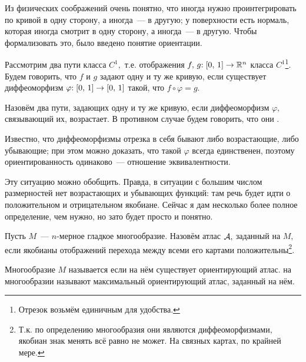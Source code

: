 \documentclass{notes}
\begin{document}
	Из физических соображений очень понятно, что иногда нужно проинтегрировать по кривой в одну сторону, а иногда~--- в другую; у поверхности есть нормаль, которая иногда смотрит в одну сторону, а иногда~--- в другую. Чтобы формализовать это, было введено понятие ориентации.

	\begin{de}
		Рассмотрим два пути класса $C^1,$ т.е. отображения $f, \, g \text{\text{:}} \; [0, \, 1] \to \mathbb{R}^n$ класса $C^1$\footnote{Отрезок возьмём единичным для удобства.}. Будем говорить, что $f$ и $g$ задают одну и ту же кривую, если существует диффеоморфизм $\varphi\text{\text{:}} \; [0, \, 1] \to [0, \, 1]$ такой, что $f \circ \varphi = g$. 
	\end{de}

	\begin{de}
		Назовём два пути, задающих одну и ту же кривую,  если диффеоморфизм $\varphi,$ связывающий их, возрастает. В противном случае будем говорить, что они .
	\end{de}

	\begin{rem}
		Известно, что диффеоморфизмы отрезка в себя бывают либо возрастающие, либо убывающие; при этом можно доказать, что такой $\varphi$ всегда единственен, поэтому ориентированность одинаково~--- отношение эквивалентности.
	\end{rem}

	Эту ситуацию можно обобщить. Правда, в ситуации с большим числом размерностей нет возрастающих и убывающих функций: там речь будет идти о положительном и отрицательном якобиане. Сейчас я дам несколько более полное определение, чем нужно, но зато будет просто и понятно.

	\begin{de}
		Пусть $M$~--- $n$-мерное гладкое многообразие. Назовём атлас $\mathcal{A},$ заданный на $M,$  если якобианы отображений перехода между всеми его картами положительны\footnote{Т.к. по определению многообразия они являются диффеоморфизмами, якобиан знак менять всё равно не может. На связных картах, по крайней мере.}.
	\end{de}

	\begin{de}
		Многообразие $M$ называется  если на нём существует ориентирующий атлас.  на многообразии называют максимальный ориентирующий атлас, заданный на нём.
	\end{de}
\end{document}
